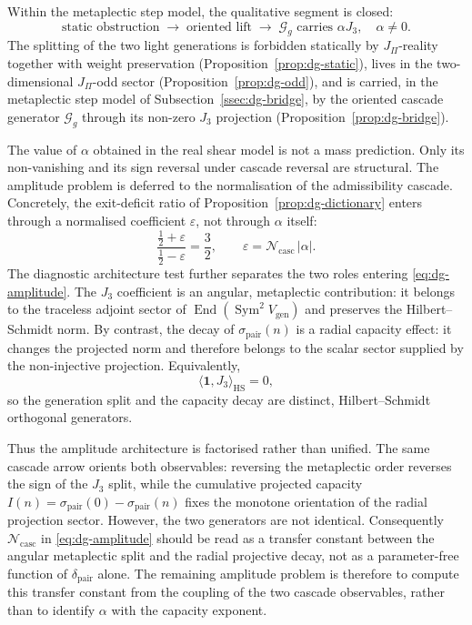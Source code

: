 \documentclass[11pt,a4paper]{article}
\theoremstyle{definition}
\theoremstyle{remark}
\DeclareMathOperator{\Sym}{Sym}
\DeclareMathOperator{\End}{End}
\begin{document}
    Within the metaplectic step model, the qualitative segment is closed:
    \begin{equation}
      \label{eq:dg-chain}
      \text{static obstruction} \;\longrightarrow\; \text{oriented lift} \;\longrightarrow\;
      \mathcal{G}_g \text{ carries } \alpha J_3, \quad \alpha \neq 0 .
    \end{equation}
    The splitting of the two light generations is forbidden statically by $J_\Pi$-reality together
    with weight preservation (Proposition~\ref{prop:dg-static}), lives in the two-dimensional
    $J_\Pi$-odd sector (Proposition~\ref{prop:dg-odd}), and is carried, in the metaplectic step
    model of Subsection~\ref{ssec:dg-bridge}, by the oriented cascade generator $\mathcal{G}_g$
    through its non-zero $J_3$ projection (Proposition~\ref{prop:dg-bridge}).

    The value of $\alpha$ obtained in the real shear model is not a mass prediction.
    Only its non-vanishing and its sign reversal under cascade reversal are structural.
    The amplitude problem is deferred to the normalisation of the admissibility cascade.
    Concretely, the exit-deficit ratio of Proposition~\ref{prop:dg-dictionary} enters through a
    normalised coefficient $\varepsilon$, not through $\alpha$ itself:
    \begin{equation}
      \label{eq:dg-amplitude}
      \frac{\tfrac12 + \varepsilon}{\tfrac12 - \varepsilon} = \frac32, \qquad
      \varepsilon = \mathcal{N}_{\mathrm{casc}}\, |\alpha| .
    \end{equation}
    The diagnostic architecture test further separates the two roles entering
    \eqref{eq:dg-amplitude}.
    The $J_3$ coefficient is an angular, metaplectic contribution: it belongs to the traceless
    adjoint sector of $\End(\Sym^2 V_{\mathrm{gen}})$ and preserves the Hilbert--Schmidt norm.
    By contrast, the decay of $\sigma_{\mathrm{pair}}(n)$ is a radial capacity effect: it changes
    the projected norm and therefore belongs to the scalar sector supplied by the non-injective
    projection.
    Equivalently,
    \[
      \langle \mathbf{1}, J_3 \rangle_{\mathrm{HS}} = 0,
    \]
    so the generation split and the capacity decay are distinct, Hilbert--Schmidt orthogonal
    generators.

    Thus the amplitude architecture is factorised rather than unified.
    The same cascade arrow orients both observables: reversing the metaplectic order reverses the
    sign of the $J_3$ split, while the cumulative projected capacity
    $I(n) = \sigma_{\mathrm{pair}}(0) - \sigma_{\mathrm{pair}}(n)$ fixes the monotone orientation
    of the radial projection sector.
    However, the two generators are not identical.
    Consequently $\mathcal{N}_{\mathrm{casc}}$ in \eqref{eq:dg-amplitude} should be read as a
    transfer constant between the angular metaplectic split and the radial projective decay, not as
    a parameter-free function of $\delta_{\mathrm{pair}}$ alone.
    The remaining amplitude problem is therefore to compute this transfer constant from the coupling
    of the two cascade observables, rather than to identify $\alpha$ with the capacity exponent.
\end{document}
